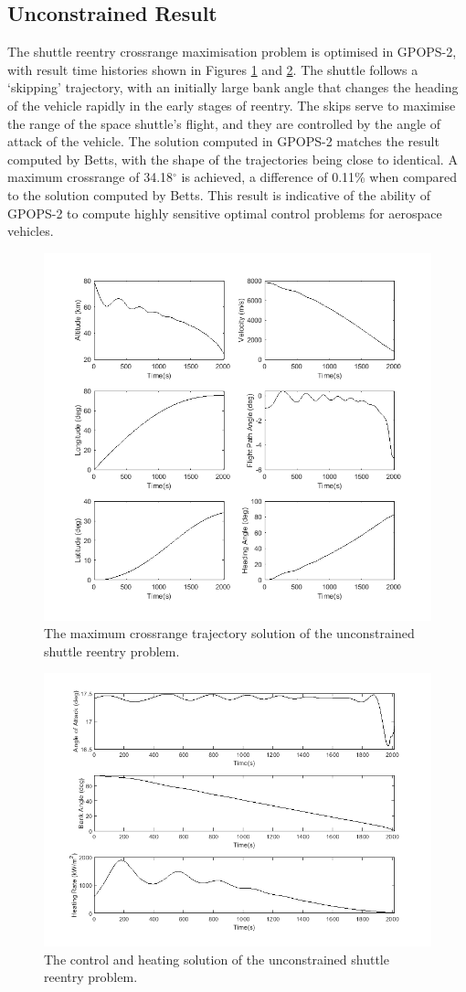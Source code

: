 \subsection{Unconstrained Result}
The shuttle reentry crossrange maximisation problem is optimised in GPOPS-2, with result time histories shown in Figures \ref{fig:SpaceShuttleNoq1} and \ref{fig:SpaceShuttleNoq2}. The shuttle follows a `skipping' trajectory, with an initially large bank angle that changes the heading of the vehicle rapidly in the early stages of reentry. The skips serve to maximise the range of the space shuttle's flight, and they are controlled by the angle of attack of the vehicle. The solution computed in GPOPS-2 matches the result computed by Betts\cite{Betts2009}, with the shape of the trajectories being close to identical. A maximum crossrange of 34.18$^\circ$ is achieved, a difference of 0.11\% when compared to the solution computed by Betts\cite{Betts2009}. This result is indicative of the ability of GPOPS-2 to compute highly sensitive optimal control problems for aerospace vehicles. 
\begin{figure}[H]
\centering
\includegraphics[width=0.7\linewidth]{figures/A1_uncertainty-analysis/SpaceShuttleNoq1}
\caption{The maximum crossrange trajectory solution of the unconstrained shuttle reentry problem.}
\label{fig:SpaceShuttleNoq1}
\end{figure}
\begin{figure}[H]
\centering
\includegraphics[width=0.7\linewidth]{figures/A1_uncertainty-analysis/SpaceShuttleNoq2}
\caption{The control and heating solution of the unconstrained shuttle reentry problem.}
\label{fig:SpaceShuttleNoq2}
\end{figure}


